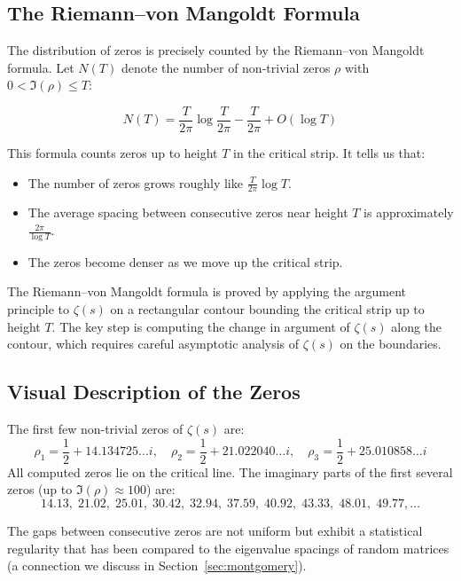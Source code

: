 \subsection{The Riemann--von Mangoldt Formula}

The distribution of zeros is precisely counted by the Riemann--von Mangoldt formula. Let $N(T)$ denote the number of non-trivial zeros $\rho$ with $0 < \Im(\rho) \le T$:

\begin{theorem}
\label{thm:rvm}
\[
N(T) = \frac{T}{2\pi} \log\frac{T}{2\pi} - \frac{T}{2\pi} + O(\log T)
\]
\end{theorem}

This formula counts zeros up to height $T$ in the critical strip. It tells us that:
\begin{itemize}
  \item The number of zeros grows roughly like $\frac{T}{2\pi} \log T$.
  \item The average spacing between consecutive zeros near height $T$ is approximately $\frac{2\pi}{\log T}$.
  \item The zeros become denser as we move up the critical strip.
\end{itemize}

The Riemann--von Mangoldt formula is proved by applying the argument principle to $\zeta(s)$ on a rectangular contour bounding the critical strip up to height $T$. The key step is computing the change in argument of $\zeta(s)$ along the contour, which requires careful asymptotic analysis of $\zeta(s)$ on the boundaries.

\subsection{Visual Description of the Zeros}

The first few non-trivial zeros of $\zeta(s)$ are:
\[
\rho_1 = \frac{1}{2} + 14.134725\ldots i, \quad \rho_2 = \frac{1}{2} + 21.022040\ldots i, \quad \rho_3 = \frac{1}{2} + 25.010858\ldots i
\]
All computed zeros lie on the critical line. The imaginary parts of the first several zeros (up to $\Im(\rho) \approx 100$) are:
\[
14.13,\; 21.02,\; 25.01,\; 30.42,\; 32.94,\; 37.59,\; 40.92,\; 43.33,\; 48.01,\; 49.77, \ldots
\]

The gaps between consecutive zeros are not uniform but exhibit a statistical regularity that has been compared to the eigenvalue spacings of random matrices (a connection we discuss in Section~\ref{sec:montgomery}).

